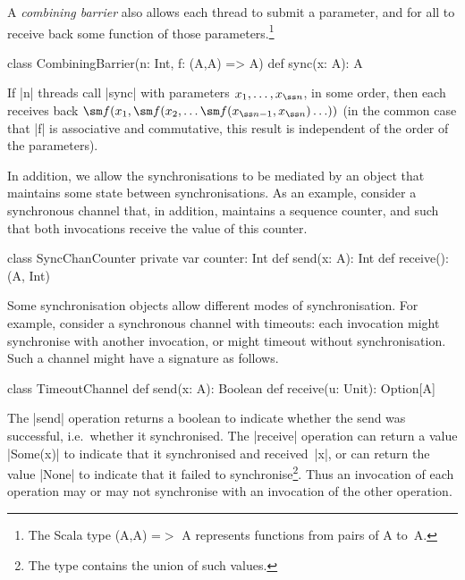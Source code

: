 A \emph{combining barrier} also allows each thread to submit a parameter, and
for all to receive back some function of those parameters.\footnote{The Scala
  type {\scalastyle (A,A) =}$>$ {\scalastyle A} represents functions from
  pairs of {\scalastyle A} to~{\scalastyle A}.}
%
\begin{scala}
class CombiningBarrier(n: Int, f: (A,A) => A){
  def sync(x: A): A
}
\end{scala}
%
If |n| threads call |sync| with parameters $x_1, \ldots, x_{\ss n}$, in some
order, then each receives back $\sm f(x_1, \sm f(x_2, \ldots \sm f(x_{{\ss
    n}-1}, x_{\ss n}) \ldots ))$ (in the common case that |f| is associative
and commutative, this result is independent of the order of the parameters).

In addition, we allow the synchronisations to be mediated by an object that
maintains some state between synchronisations.  As an example, consider a
synchronous channel that, in addition, maintains a sequence counter, and such
that both invocations receive the value of this counter.
\begin{scala}
class SyncChanCounter{
  private var counter: Int
  def send(x: A): Int
  def receive(): (A, Int)
}
\end{scala}



Some synchronisation objects allow different modes of synchronisation.  For
example, consider a synchronous channel with timeouts: each invocation might
synchronise with another invocation, or might timeout without
synchronisation.  Such a channel might have a signature as follows.
%
\begin{scala}
class TimeoutChannel{
  def send(x: A): Boolean
  def receive(u: Unit): Option[A]
}
\end{scala}
%
The |send| operation returns a boolean to indicate whether the send was
successful, i.e.~whether it synchronised.  The |receive| operation can return
a value |Some(x)| to indicate that it synchronised and received~|x|, or can
return the value |None| to indicate that it failed to synchronise\footnote{The
  type  contains the union of such values.}.  Thus an
invocation of each operation may or may not synchronise with an invocation of
the other operation. 

